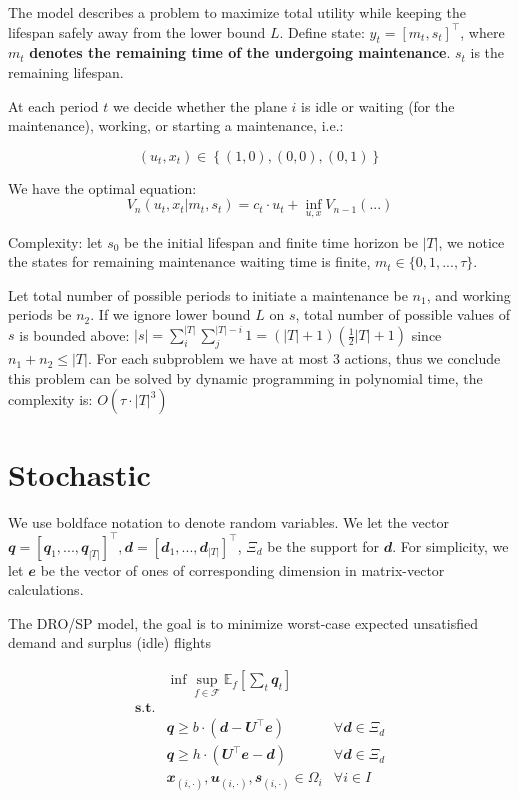 \documentclass[
  a4paper,
,tablecaptionabove
]{scrartcl}
\numberwithin{equation}{section}
\begin{document}
The model describes a problem to maximize total utility while keeping
the lifespan safely away from the lower bound \(L\). Define state:
\(y_t = \left[m_t,s_t \right]^\top\), where \(m_t\) \textbf{denotes the
  remaining time of the undergoing maintenance}. \(s_t\) is the remaining
lifespan.

At each period \(t\) we decide whether the plane \(i\) is idle or
waiting (for the maintenance), working, or starting a maintenance, i.e.:

\[(u_t, x_t) \in \left\{(1, 0), (0,0), (0, 1)\right\}\]

We have the optimal equation:
\[V_n(u_t, x_t | m_t, s_t) = c_t \cdot u_t + \inf_{u,x} V_{n-1}(...)\]

Complexity: let \(s_0\) be the initial lifespan and finite time horizon
be \(|T|\), we notice the states for remaining maintenance waiting time
is finite, \(m_t \in \{0, 1, ..., \tau\}\).

Let total number of possible periods to initiate a maintenance be
\(n_1\), and working periods be \(n_2\). If we ignore lower bound \(L\)
on \(s\), total number of possible values of \(s\) is bounded above:
\(|s| = \sum_i^{|T|}\sum_j^{|T| - i} 1=(|T| + 1)(\frac{1}{2}|T| + 1)\)
since \(n_1 + n_2 \le |T|\). For each subproblem we have at most 3
actions, thus we conclude this problem can be solved by dynamic
programming in polynomial time, the complexity is:
\(O\left(\tau\cdot|T|^3 \right)\)

\hypertarget{sec:stochastic}{%
  \section{Stochastic}\label{stochastic}}

We use boldface notation to denote random variables. We let the vector
\(\mathbfit q = [\mathbfit q_1, ..., \mathbfit q_{|T|}]^\top, \mathbfit d = [\mathbfit d_1,...,\mathbfit d_{|T|}]^\top\),
\(\Xi_d\) be the support for \(\mathbfit{d}\). For simplicity, we let
\(\mathbfit e\) be the vector of ones of corresponding dimension in
matrix-vector calculations.

The DRO/SP model, the goal is to minimize worst-case expected
unsatisfied demand and surplus (idle) flights

\[\begin{aligned}
                  & \inf \sup_{f\in \mathscr F}\mathbb E_f \left[ \sum_t \mathbfit q_t  \right]                                            \\
    \mathbf{s.t.} &                                                                                                                        \\
                  & \mathbfit q \ge b\cdot \left (\mathbfit d - \mathbfit U^\top \mathbfit{e} \right)      & \forall \mathbfit d \in \Xi_d \\
                  & \mathbfit q \ge h\cdot \left ( \mathbfit U^\top \mathbfit{e}  - \mathbfit d \right )   & \forall \mathbfit d \in \Xi_d \\
                  & \mathbfit x_{(i,\cdot)}, \mathbfit u_{(i,\cdot)}, \mathbfit s_{(i,\cdot)} \in \Omega_i & \forall i\in I
  \end{aligned}\]
\end{document}
